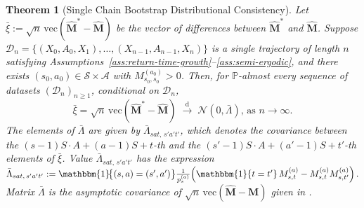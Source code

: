 \documentclass{article}
\numberwithin{equation}{section}
\newcommand{\indicator}{\mathbbm{1}}
\newtheorem{theorem}{Theorem}
\begin{document}
\begin{theorem}[Single Chain Bootstrap Distributional Consistency]
\label{thm:bootstrap-M}
Let $\bar \xi := \sqrt{n}\,\mathrm{vec}(\hat{\mathbf{M}}^\ast - \hat{\mathbf{M}})$ be the vector of differences between $\hat{\mathbf{M}}^\ast$ and $\hat{\mathbf{M}}$.
Suppose $\mathcal{D}_n = \{(X_0,A_0,X_1), \ldots, (X_{n-1},A_{n-1},X_n)\}$ is a single trajectory of length $n$ satisfying Assumptions~\ref{ass:return-time-growth}--\ref{ass:semi-ergodic}, and there exists $(s_0,a_0)\in\mathcal{S}\times\mathcal{A}$ with $M_{s_0,s_0}^{(a_0)}>0$. 
Then, for $\mathbb{P}$-almost every sequence of datasets $(\mathcal{D}_n)_{n\ge 1}$, conditional on $\mathcal{D}_n$,
\[
\bar \xi  = \sqrt{n}\,\mathrm{vec}(\hat{\mathbf{M}}^\ast - \hat{\mathbf{M}})
\;\xrightarrow{\mathrm{d}}\;
\mathcal{N}(0,\bar\Lambda) \text{, as $n \to \infty$}.
\]
The elements of $\bar \Lambda$ are given by $\bar\Lambda_{sat,\,s'a't'}$, which denotes the covariance between the $(s-1)S \cdot A+(a-1)S+t$-th and the $(s'-1)S\cdot A+(a'-1)S+t'$-th elements of $\bar \xi$.
Value $\bar\Lambda_{sat,\,s'a't'}$ has the expression $\bar\Lambda_{sat,\,s'a't'} := \indicator\!\bigl\{(s,a)=(s',a')\bigr\} \frac{1}{p_s^{(a)}}\!\left(\indicator\!\left\{t=t'\right\}M_{s,t}^{(a)} - M_{s,t}^{(a)}M_{s,t'}^{(a)}\right).$
Matrix $\bar\Lambda$ is the asymptotic covariance of $\sqrt{n}\,\mathrm{vec}(\hat{\mathbf{M}}-\mathbf{M})$ given in \citet[Corollary~1]{su2025centrallimittheoremstransition}.
\end{theorem}
\end{document}
